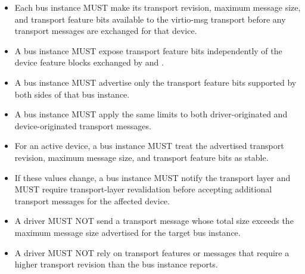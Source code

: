 \begin{itemize}
  \item Each bus instance MUST make its transport revision, maximum message
        size, and transport feature bits available to the virtio-msg transport
        before any transport messages are exchanged for that device.
  \item A bus instance MUST expose transport feature bits independently of the
        device feature blocks exchanged by  and
        .
  \item A bus instance MUST advertise only the transport feature bits supported
        by both sides of that bus instance.
  \item A bus instance MUST apply the same limits to both driver-originated and
        device-originated transport messages.
  \item For an active device, a bus instance MUST treat the advertised
        transport revision, maximum message size, and transport feature bits as
        stable.
  \item If these values change, a bus instance MUST notify the transport layer
        and MUST require transport-layer revalidation before accepting
        additional transport messages for the affected device.
\end{itemize}

\begin{itemize}
  \item A driver MUST NOT send a transport message whose total size exceeds the
        maximum message size advertised for the target bus instance.
  \item A driver MUST NOT rely on transport features or messages that require a
        higher transport revision than the bus instance reports.
\end{itemize}

